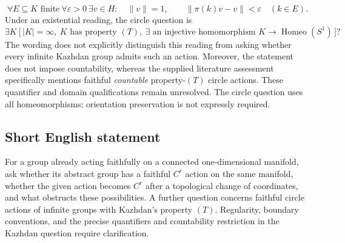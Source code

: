 \documentclass[11pt]{article}
\begin{document}
\[
\forall E\subseteq K\text{ finite}\ \forall\varepsilon>0\ \exists v\in H:
\quad \|v\|=1,\qquad
\|\pi(k)v-v\|<\varepsilon\quad(k\in E).
\]
Under an existential reading, the circle question is
\[
\exists K\ \bigl[\,|K|=\infty,\ K\text{ has property }(T),\ 
\exists\text{ an injective homomorphism }
K\to\operatorname{Homeo}(S^1)\,\bigr]?
\]
The wording does not explicitly distinguish this reading from asking whether every infinite Kazhdan group admits such an action. Moreover, the statement does not impose countability, whereas the supplied literature assessment specifically mentions faithful \emph{countable} property-\((T)\) circle actions. These quantifier and domain qualifications remain unresolved. The circle question uses all homeomorphisms; orientation preservation is not expressly required.
\subsection{Short English statement}
For a group already acting faithfully on a connected one-dimensional manifold, ask whether its abstract group has a faithful \(C^r\) action on the same manifold, whether the given action becomes \(C^r\) after a topological change of coordinates, and what obstructs these possibilities. A further question concerns faithful circle actions of infinite groups with Kazhdan's property \((T)\). Regularity, boundary conventions, and the precise quantifiers and countability restriction in the Kazhdan question require clarification.
\end{document}
